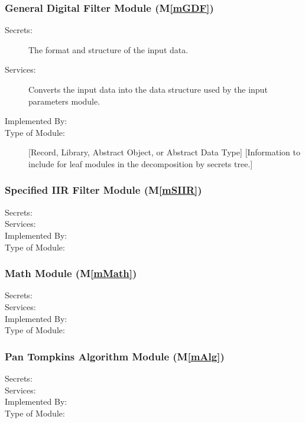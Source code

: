 \documentclass[12pt, titlepage]{article}
\newcommand{\mref}[1]{M\ref{#1}}
\begin{document}
\subsubsection{General Digital Filter Module (\mref{mGDF})}

\begin{description}
\item[Secrets:]The format and structure of the input data.
\item[Services:]Converts the input data into the data structure used by the
  input parameters module.
\item[Implemented By:] \progname
\item[Type of Module:] [Record, Library, Abstract Object, or Abstract Data Type]
  [Information to include for leaf modules in the decomposition by secrets
  tree.]
\end{description}

\subsubsection{Specified IIR Filter Module (\mref{mSIIR})}

\begin{description}
\item[Secrets:]
\item[Services:]
\item[Implemented By:] \progname
\item[Type of Module:]
\end{description}

\subsubsection{Math Module (\mref{mMath})}

\begin{description}
\item[Secrets:]
\item[Services:]
\item[Implemented By:] \progname
\item[Type of Module:]
\end{description}

\subsubsection{Pan Tompkins Algorithm Module (\mref{mAlg})}

\begin{description}
\item[Secrets:]
\item[Services:]
\item[Implemented By:] \progname
\item[Type of Module:]
\end{description}
\end{document}
